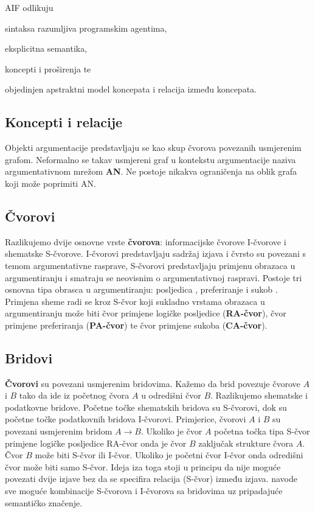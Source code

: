 AIF odlikuju 
\begin{enumerate*}
    \item sintaksa razumljiva programskim agentima,
    \item eksplicitna semantika,
    \item koncepti i proširenja te
    \item objedinjen apstraktni model koncepata i relacija između
koncepata.
\end{enumerate*}

\subsection{Koncepti i relacije}

Objekti argumentacije predstavljaju se kao skup čvorova povezanih usmjerenim grafom. 
Neformalno se takav usmjereni graf u kontekstu argumentacije naziva
argumentativnom mrežom  \textbf{AN}. Ne 
postoje nikakva ograničenja na oblik grafa koji može poprimiti AN.

\subsection{Čvorovi}

Razlikujemo dvije osnovne vrste \textbf{čvorova}: informacijske čvorove
 I-čvorove i shematske  S-čvorove.
I-čvorovi predstavljaju sadržaj izjava i čvrsto su povezani s temom
argumentativne rasprave, S-čvorovi predstavljaju primjenu obrazaca u
argumentiranju i smatraju se neovisnim o argumentativnoj raspravi. Postoje tri
osnovna tipa obrasca u argumentiranju: posljedica ,
preferiranje  i sukob . Primjena sheme
radi se kroz S-čvor koji sukladno vrstama obrazaca u argumentiranju može biti
čvor primjene logičke posljedice  (\textbf{RA-čvor}), 
čvor primjene preferiranja  (\textbf{PA-čvor}) te
čvor primjene sukoba  (\textbf{CA-čvor}).

\subsection{Bridovi}

\textbf{Čvorovi} su povezani usmjerenim bridovima. Kažemo da brid povezuje čvorove $A$ i $B$
tako da ide iz početnog čvora $A$ u odredišni čvor $B$. Razlikujemo shematske i podatkovne
bridove. Početne točke shematskih bridova su S-čvorovi, dok su početne točke 
podatkovnih bridova I-čvorovi. Primjerice, čvorovi $A$ i $B$ su povezani usmjerenim bridom 
$A \rightarrow B$. Ukoliko je čvor $A$ početna točka tipa
S-čvor primjene logičke posljedice RA-čvor onda je čvor $B$ zaključak strukture
čvora $A$. Čvor $B$ može biti S-čvor ili I-čvor. Ukoliko je početni čvor I-čvor onda
odredišni čvor može biti samo S-čvor. 
Ideja iza toga stoji u principu da nije moguće povezati dvije izjave bez da se
specifira relacija (S-čvor) između izjava. 
\cite{chesnevar2006towards} navode sve moguće kombinacije S-čvorova i I-čvorova
sa bridovima uz pripadajuće semantičko značenje. 

